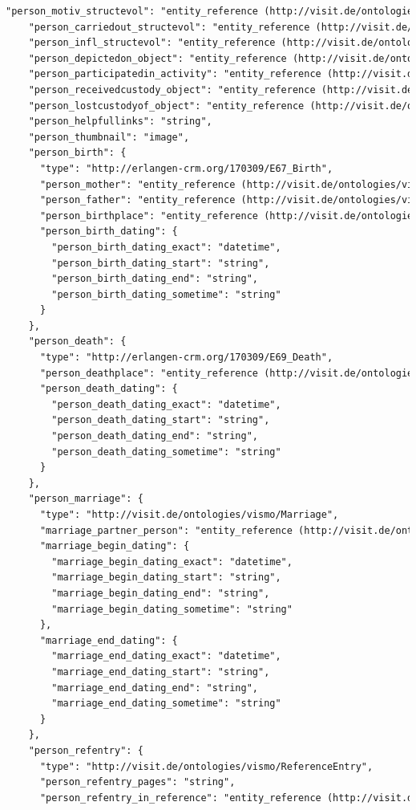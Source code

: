 \begin{lstlisting}[caption={JSON \q{Schema} der ViSIT Daten, die über die REST API ausgespielt werden.},label={lst:json},captionpos=b,language=xml]
    "person_motiv_structevol": "entity_reference (http://visit.de/ontologies/vismo/Architecture)",
    "person_carriedout_structevol": "entity_reference (http://visit.de/ontologies/vismo/Architecture)",
    "person_infl_structevol": "entity_reference (http://visit.de/ontologies/vismo/Architecture)",
    "person_depictedon_object": "entity_reference (http://visit.de/ontologies/vismo/Object)",
    "person_participatedin_activity": "entity_reference (http://visit.de/ontologies/vismo/Activity)",
    "person_receivedcustody_object": "entity_reference (http://visit.de/ontologies/vismo/Object)",
    "person_lostcustodyof_object": "entity_reference (http://visit.de/ontologies/vismo/Object)",
    "person_helpfullinks": "string",
    "person_thumbnail": "image",
    "person_birth": {
      "type": "http://erlangen-crm.org/170309/E67_Birth",
      "person_mother": "entity_reference (http://visit.de/ontologies/vismo/Person)",
      "person_father": "entity_reference (http://visit.de/ontologies/vismo/Person)",
      "person_birthplace": "entity_reference (http://visit.de/ontologies/vismo/Place)",
      "person_birth_dating": {
        "person_birth_dating_exact": "datetime",
        "person_birth_dating_start": "string",
        "person_birth_dating_end": "string",
        "person_birth_dating_sometime": "string"
      }
    },
    "person_death": {
      "type": "http://erlangen-crm.org/170309/E69_Death",
      "person_deathplace": "entity_reference (http://visit.de/ontologies/vismo/Place)",
      "person_death_dating": {
        "person_death_dating_exact": "datetime",
        "person_death_dating_start": "string",
        "person_death_dating_end": "string",
        "person_death_dating_sometime": "string"
      }
    },
    "person_marriage": {
      "type": "http://visit.de/ontologies/vismo/Marriage",
      "marriage_partner_person": "entity_reference (http://visit.de/ontologies/vismo/Person)",
      "marriage_begin_dating": {
        "marriage_begin_dating_exact": "datetime",
        "marriage_begin_dating_start": "string",
        "marriage_begin_dating_end": "string",
        "marriage_begin_dating_sometime": "string"
      },
      "marriage_end_dating": {
        "marriage_end_dating_exact": "datetime",
        "marriage_end_dating_start": "string",
        "marriage_end_dating_end": "string",
        "marriage_end_dating_sometime": "string"
      }
    },
    "person_refentry": {
      "type": "http://visit.de/ontologies/vismo/ReferenceEntry",
      "person_refentry_pages": "string",
      "person_refentry_in_reference": "entity_reference (http://visit.de/ontologies/vismo/Reference)"

\end{lstlisting}
